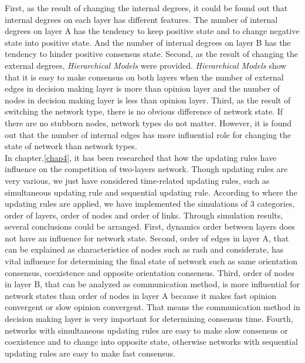 First, as the result of changing the internal degrees, it could be found out that internal degrees on each layer has different features. The number of internal degrees on layer A has the tendency to keep positive state and to change negative state into positive state. And the number of internal degrees on layer B has the tendency to hinder positive consensus state. Second, as the result of changing the external degrees, \textit{Hierarchical Models} were provided. \textit{Hierarchical Models} show that it is easy to make consensus on both layers when the number of external edges in decision making layer is more than opinion layer and the number of nodes in decision making layer is less than opinion layer. Third, as the result of switching the network type, there is no obvious difference of network state. If there are no stubborn nodes, network types do not matter. However, it is found out that the number of internal edges has more influential role for changing the state of network than network types.\\

In chapter.\ref{chap4}, it has been researched that how the updating rules have influence on the competition of two-layers network. Though updating rules are very various, we just have considered time-related updating rules, such as simultaneous updating rule and sequential updating rule. According to where the updating rules are applied, we have implemented the simulations of 3 categories, order of layers, order of nodes and order of links. Through simulation results, several conclusions could be arranged. First, dynamics order between layers does not have an influence for network state. Second, order of edges in layer A, that can be explained as characteristics of nodes such as rash and considerate, has vital influence for determining the final state of network such as same orientation consensus, coexistence and opposite orientation consensus. Third, order of nodes in layer B, that can be analyzed as communication method, is more influential for network states than order of nodes in layer A because it makes fast opinion convergent or slow opinion convergent. That means the communication method in decision making layer is very important for determining consensus time. Fourth, networks with simultaneous updating rules are easy to make slow consensus or coexistence and to change into opposite state, otherwise networks with sequential updating rules are easy to make fast consensus.\\

